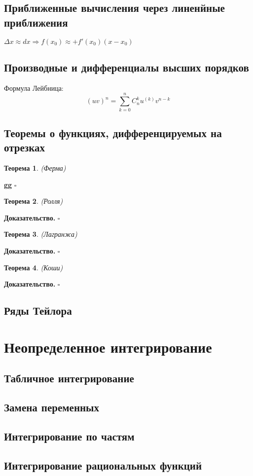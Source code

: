 \documentclass[a4paper]{article}
\newtheorem{theor}{Теорема}
\begin{document}
\subsection{Приближенные вычисления через линенйные приближения}
$\Delta x\approx dx\Rightarrow f(x_0)\approx+f'(x_0)(x-x_0)$
\subsection{Производные и дифференциалы высших порядков}
Формула Лейбница: $$\boxed{(uv)^{n}=\sum\limits^n_{k=0}C_n^ku^{(k)}v^{n-k}}$$
\subsection{Теоремы о функциях, дифференцируемых на отрезках}
\begin{theor} (Ферма)\\

\end{theor}
\textbf{gg}    $\square$
\begin{theor} (Ролля)

\end{theor}
\textbf{Доказательство.}  $\square$
\begin{theor} (Лагранжа)
\end{theor}
\textbf{Доказательство.}  $\square$
\begin{theor} (Коши)

\end{theor}
\textbf{Доказательство.}  $\square$


\subsection{Ряды Тейлора}
\section{Неопределенное интегрирование}
\subsection{Табличное интегрирование}
\subsection{Замена переменных}
\subsection{Интегрирование по частям}
\subsection{Интегрирование рациональных функций}
\end{document}
